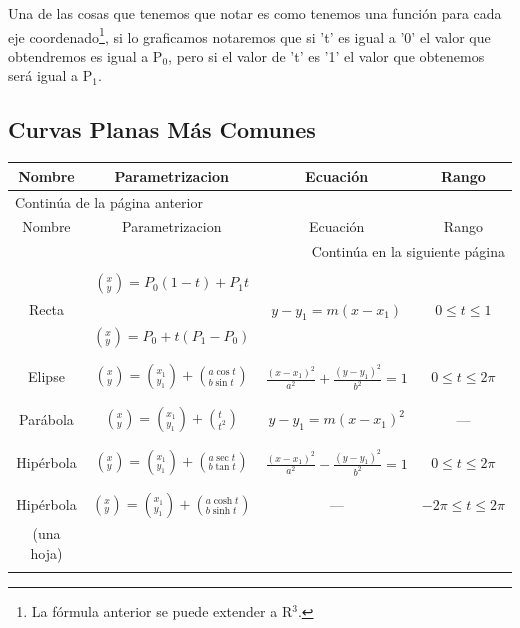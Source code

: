 \documentclass{article}
\begin{document}
Una de las cosas que tenemos que notar es como tenemos una función para cada eje coordenado\footnote{La fórmula anterior se puede extender a R\(^{\text{3}}\).}, si lo graficamos notaremos que si 't' es igual a '0' el valor que obtendremos es igual a P\(_{\text{0}}\), pero si el valor de 't' es '1' el valor que obtenemos será igual a P\(_{\text{1}}\).

\subsection{Curvas Planas Más Comunes}
\label{sec:orgf4d8e9d}
\begin{longtable}{|c|c|c|c|}
\hline
Nombre & Parametrizacion & Ecuación & Rango\\
\hline
\endfirsthead
\multicolumn{4}{l}{Continúa de la página anterior} \\
\hline

Nombre & Parametrizacion & Ecuación & Rango \\

\hline
\endhead
\hline\multicolumn{4}{r}{Continúa en la siguiente página} \\
\endfoot
\endlastfoot
\hline
 &  &  & \\
 & \((^x_y)=P_0(1-t)+P_1t\) &  & \\
Recta &  & \(y-y_1=m(x-x_1)\) & \(0\leq t\leq 1\)\\
 & \((^x_y)=P_0+t(P_1-P_0)\) &  & \\
 &  &  & \\
\hline
 &  &  & \\
Elipse & \((^x_y)=(^{x_1}_{y_1})+\left(^{a\cos t}_{b\sin t}\right)\) & \(\frac{(x-x_1)^2}{a^2}+\frac{(y-y_1)^2}{b^2}=1\) & \(0\leq t\leq 2\pi\)\\
 &  &  & \\
\hline
 &  &  & \\
Parábola & \((^x_y)=(^{x_1}_{y_1})+\left(^{t}_{t^2}\right)\) & \(y-y_1=m(x-x_1)^2\) & ---\\
 &  &  & \\
\hline
 &  &  & \\
Hipérbola & \((^x_y)=(^{x_1}_{y_1})+\left(^{a\sec t}_{b\tan t}\right)\) & \(\frac{(x-x_1)^2}{a^2}-\frac{(y-y_1)^2}{b^2}=1\) & \(0\leq t\leq 2\pi\)\\
 &  &  & \\
\hline
 &  &  & \\
Hipérbola & \((^x_y)=(^{x_1}_{y_1})+\left(^{a\cosh t}_{b\sinh t}\right)\) & --- & \(-2\pi\leq t\leq 2\pi\)\\
(una hoja) &  &  & \\
 &  &  & \\
\hline
\end{longtable}
\end{document}
